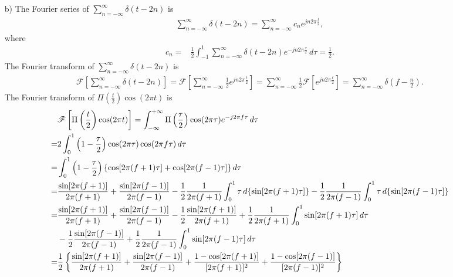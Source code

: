 \documentclass{assignment}
\begin{document}
\begin{sol}
\begin{itemize}
        \item[b)] The Fourier series of $\sum_{n=-\infty}^{\infty}\delta(t-2n)$ is
        \begin{align}
            \sum_{n=-\infty}^{\infty}\delta(t-2n)=\sum_{n=-\infty}^{\infty}c_ne^{jn2\pi\frac{t}{2}},
        \end{align}
        where
        \begin{align}
            c_n=&\frac{1}{2}\int_{-1}^1\sum_{n=-\infty}^{\infty}\delta(t-2n)e^{-jn2\pi\frac{\tau}{2}}\,d\tau=\frac{1}{2}.
        \end{align}
        The Fourier transform of $\sum_{n=-\infty}^{\infty}\delta(t-2n)$ is
        \begin{align}
            \mathscr{F}\left[\sum_{n=-\infty}^{\infty}\delta(t-2n)\right]=\mathscr{F}\left[\sum_{n=-\infty}^{\infty}\frac{1}{2}e^{jn2\pi\frac{t}{2}}\right]=\sum_{n=-\infty}^{\infty}\frac{1}{2}\mathscr{F}\left[e^{jn2\pi\frac{t}{2}}\right]=\sum_{n=-\infty}^{\infty}\delta\left(f-\frac{n}{2}\right).
        \end{align}
        The Fourier transform of $\Pi\left(\frac{t}{2}\right)\cos(2\pi t)$ is
        \small\begin{align}
            \notag&\mathscr{F}\left[\Pi\left(\frac{t}{2}\right)\cos(2\pi t)\right]=\int_{-\infty}^{+\infty}\Pi\left(\frac{\tau}{2}\right)\cos(2\pi\tau)e^{-j2\pi f\tau}\,d\tau\\
            \notag=&2\int_0^1\left(1-\frac{\tau}{2}\right)\cos(2\pi\tau)\cos(2\pi f\tau)\,d\tau\\
            \notag=&\int_0^1\left(1-\frac{\tau}{2}\right)\{\cos[2\pi(f+1)\tau]+\cos[2\pi(f-1)\tau]\}\,d\tau\\
            \notag=&\frac{\sin[2\pi(f+1)]}{2\pi(f+1)}+\frac{\sin[2\pi(f-1)]}{2\pi(f-1)}-\frac{1}{2}\frac{1}{2\pi(f+1)}\int_0^1\tau\,d\{\sin[2\pi(f+1)\tau]\}-\frac{1}{2}\frac{1}{2\pi(f-1)}\int_0^1\tau\,d\{\sin[2\pi(f-1)\tau]\}\\
            \notag=&\frac{\sin[2\pi(f+1)]}{2\pi(f+1)}+\frac{\sin[2\pi(f-1)]}{2\pi(f-1)}-\frac{1}{2}\frac{\sin[2\pi(f+1)]}{2\pi(f+1)}+\frac{1}{2}\frac{1}{2\pi(f+1)}\int_0^1\sin[2\pi(f+1)\tau]\,d\tau\\
            \notag&-\frac{1}{2}\frac{\sin[2\pi(f-1)]}{2\pi(f-1)}+\frac{1}{2}\frac{1}{2\pi(f-1)}\int_0^1\sin[2\pi(f-1)\tau]\,d\tau\\
            =&\frac{1}{2}\left\{\frac{\sin[2\pi(f+1)]}{2\pi(f+1)}+\frac{\sin[2\pi(f-1)]}{2\pi(f-1)}+\frac{1-\cos[2\pi(f+1)]}{[2\pi(f+1)]^2}+\frac{1-\cos[2\pi(f-1)]}{[2\pi(f-1)]^2}\right\}

\end{align}
\end{itemize}
\end{sol}
\end{document}
